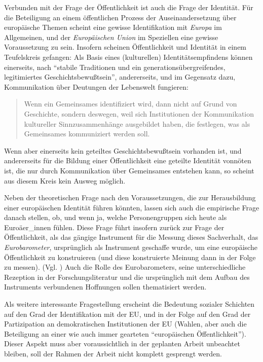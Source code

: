 \documentclass[a4paper, german, oneside]{scrartcl}
\begin{document}
Verbunden mit der Frage der Öffentlichkeit ist auch die Frage der Identität. Für die Beteiligung an einem öffentlichen Prozess der Auseinandersetzung über europäische Themen scheint eine gewisse Identifikation mit \emph{Europa} im Allgemeinen, und der \emph{Europäischen Union} im Speziellen eine gewisse Voraussetzung zu sein. Insofern scheinen Öffentlichkeit und Identität in einem Teufelskreis gefangen: Als Basis eines (kulturellen) Identitätsempfindens können einerseits, nach \textcite[28]{segers_konstruktion_1999} \enquote{stabile Traditionen und ein generationsübergreifendes, legitimiertes Geschichtsbewußtsein}, andererseits, und im Gegensatz dazu, Kommunikation über Deutungen der Lebenswelt fungieren:  \blockquote[{\cite[160]{eder_integration_1999}}]{Wenn ein Gemeinsames identifiziert wird, dann nicht auf Grund von Geschichte, sondern deswegen, weil sich Institutionen der Kommunikation kultureller Sinnzusammenhänge ausgebildet haben, die festlegen, was als Gemeinsames kommuniziert werden soll.} Wenn aber einerseits kein geteiltes Geschichtsbewußtsein vorhanden ist, und andererseits für die Bildung einer Öffentlichkeit eine geteilte Identität vonnöten ist, die nur durch Kommunikation über Gemeinsames entstehen kann, so scheint aus diesem Kreis kein Ausweg möglich.

Neben der theoretischen Frage nach den Voraussetzungen, die zur Herausbildung einer europäischen Identität führen könnten, lassen sich auch die empirische Frage danach stellen, ob, und wenn ja, welche Personengruppen sich heute als Euroäer\_innen fühlen. Diese Frage führt insofern zurück zur Frage der Öffentlichkeit, als das gängige Instrument für die Messung dieses Sachverhalt, das \emph{Eurobarometer}, ursprünglich als Instrument geschaffe wurde, um eine europäische Öffentlichkeit zu konstruieren (und diese konstruierte Meinung dann in der Folge zu messen).
 (Vgl. \textcite[542]{weichbold_eurobarometer_2009}) Auch die Rolle des Eurobarometers, seine unterschiedliche Rezeption in der Forschungsliteratur und die ursprünglich mit dem Aufbau des Instruments verbundenen Hoffnungen sollen thematisiert werden.


Als weitere interessante Fragestellung erscheint die Bedeutung sozialer Schichten auf den Grad der Identifikation mit der EU, und in der Folge auf den Grad der Partizipation an demokratischen Institutionen der EU (Wahlen, aber auch die Beteiligung an einer wie auch immer gearteten \enquote{europäischen Öffentlichkeit}). Dieser Aspekt muss aber voraussichtlich in der geplanten Arbeit unbeachtet bleiben, soll der Rahmen der Arbeit nicht komplett gesprengt werden.
\end{document}
